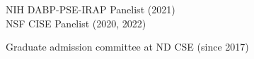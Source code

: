 \documentclass[10pt]{article}
\newenvironment{myindentpar}[1]%
{\begin{list}{}%
         {\setlength{\leftmargin}{#1}}%
         \item[]%
}
{\end{list}}
\newcounter{list}
\begin{document}
\begin{myindentpar}{0.75cm}

\hspace{-0.75cm}{\bf Governmental Service}

{\small

\textcolor{white}{} NIH DABP-PSE-IRAP Panelist (2021) \\
\textcolor{white}{} NSF CISE Panelist (2020, 2022)
}

\hspace{-0.75cm}{\bf Departmental Service}

{\small

\textcolor{white}{} Graduate admission committee at ND CSE (since 2017)
}

\hspace{-0.75cm}{\bf Ph.D. Dissertation Committee}

{\small

}
\end{myindentpar}
\end{document}
